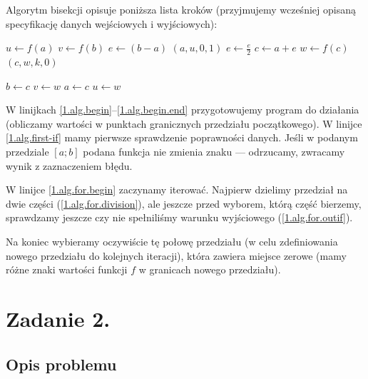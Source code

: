 \documentclass[10pt]{article}
\begin{document}
Algorytm bisekcji opisuje poniższa lista kroków (przyjmujemy wcześniej opisaną specyfikację danych wejściowych i wyjściowych):

\begin{algorithm}[H]
    \begin{algorithmic}[1]
      \State $u \gets f(a)$\label{1.alg.begin}
      \State $v \gets f(b)$
      \State $e \gets (b-a)$\label{1.alg.begin.end}
      \label{1.alg.first-if}
        \State \Return $(a, u, 0, 1)$
      \EndIf
      \label{1.alg.for.begin}
        \State $e \gets \frac{e}{2}$\label{1.alg.for.division}
        \State $c \gets a + e$
        \State $w \gets f(c)$\label{1.alg.for.division-end}
        \label{1.alg.for.outif}
            \State \Return $(c, w, k, 0)$
        \EndIf

        \label{1.alg.for.choose}
            \State $b \gets c$
            \State $v \gets w$
        \Else
            \State $a \gets c$
            \State $u \gets w$
        \EndIf\label{1.alg.for.choose.end}
      \EndFor
    \end{algorithmic}
\end{algorithm}

W linijkach \ref{1.alg.begin}–\ref{1.alg.begin.end} przygotowujemy program do działania (obliczamy wartości w punktach granicznych przedziału początkowego). W linijce \ref{1.alg.first-if} mamy pierwsze sprawdzenie poprawności danych. Jeśli w podanym przedziale $[a;b]$ podana funkcja nie zmienia znaku — odrzucamy, zwracamy wynik z zaznaczeniem błędu.

W linijce \ref{1.alg.for.begin} zaczynamy iterować. Najpierw dzielimy przedział na dwie części (\ref{1.alg.for.division}), ale jeszcze przed wyborem, którą część bierzemy, sprawdzamy jeszcze czy nie spełniliśmy warunku wyjściowego (\ref{1.alg.for.outif}).

Na koniec wybieramy oczywiście tę połowę przedziału (w celu zdefiniowania nowego przedziału do kolejnych iteracji), która zawiera miejsce zerowe (mamy różne znaki wartości funkcji $f$ w granicach nowego przedziału).

\section{Zadanie 2.}\label{2.}

\subsection{Opis problemu}
\end{document}
